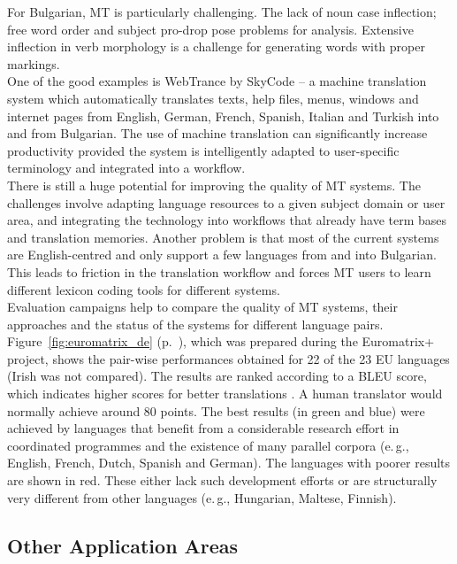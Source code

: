 \begin{multicols}{2}
  For Bulgarian, MT is particularly challenging. The lack of noun case inflection; free word order and subject pro-drop pose problems for analysis. Extensive inflection in verb morphology is a challenge for generating words with proper markings. \\
  One of the good examples is WebTrance by SkyCode – a machine translation system which automatically translates texts, help files, menus, windows and internet pages from English, German, French, Spanish, Italian and Turkish into and from Bulgarian.  The use of machine translation can significantly increase productivity provided the system is intelligently adapted to user-specific terminology and integrated into a workflow. \\
  There is still a huge potential for improving the quality of MT systems. The challenges involve adapting language resources to a given subject domain or user area, and integrating the technology into workflows that already have term bases and translation memories. Another problem is that most of the current systems are English-centred and only support a few languages from and into Bulgarian. This leads to friction in the translation workflow and forces MT users to learn different lexicon coding tools for different systems.\\
  Evaluation campaigns help to compare the quality of MT systems, their approaches and the status of the systems for different language pairs. Figure~\ref{fig:euromatrix_de} (p.~\pageref{fig:euromatrix_de}), which was prepared during the Euromatrix+ project, shows the pair-wise performances obtained for 22 of the 23 EU languages (Irish was not compared). The results are ranked according to a BLEU score, which indicates higher scores for better translations \cite{bleu1}. A human translator would normally achieve around 80 points. The best results (in green and blue) were achieved by languages that benefit from a considerable research effort in coordinated programmes and the existence of many parallel corpora (e.\,g., English, French, Dutch, Spanish and German). The languages with poorer results are shown in red. These either lack such development efforts or are structurally very different from other languages (e.\,g., Hungarian, Maltese, Finnish).

  \subsection{Other Application Areas}


\end{multicols}
